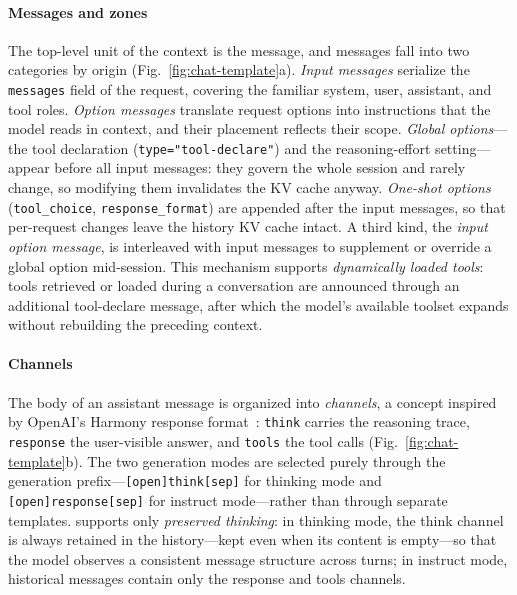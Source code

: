 \paragraph{Messages and zones}
The top-level unit of the context is the message, and messages fall into two categories by origin (Fig.~\ref{fig:chat-template}a). \emph{Input messages} serialize the \texttt{messages} field of the request, covering the familiar system, user, assistant, and tool roles. \emph{Option messages} translate request options into instructions that the model reads in context, and their placement reflects their scope. \emph{Global options}---the tool declaration (\texttt{type="tool-declare"}) and the reasoning-effort setting---appear before all input messages: they govern the whole session and rarely change, so modifying them invalidates the KV cache anyway. \emph{One-shot options} (\texttt{tool\_choice}, \texttt{response\_format}) are appended after the input messages, so that per-request changes leave the history KV cache intact. A third kind, the \emph{input option message}, is interleaved with input messages to supplement or override a global option mid-session. This mechanism supports \emph{dynamically loaded tools}: tools retrieved or loaded during a conversation are announced through an additional tool-declare message, after which the model's available toolset expands without rebuilding the preceding context.

\paragraph{Channels}
The body of an assistant message is organized into \emph{channels}, a concept inspired by OpenAI's Harmony response format~\citep{openai2025harmony}: \texttt{think} carries the reasoning trace, \texttt{response} the user-visible answer, and \texttt{tools} the tool calls (Fig.~\ref{fig:chat-template}b). The two generation modes are selected purely through the generation prefix---\texttt{[open]think[sep]} for thinking mode and \texttt{[open]response[sep]} for instruct mode---rather than through separate templates.  supports only \emph{preserved thinking}: in thinking mode, the think channel is always retained in the history---kept even when its content is empty---so that the model observes a consistent message structure across turns; in instruct mode, historical messages contain only the response and tools channels.

